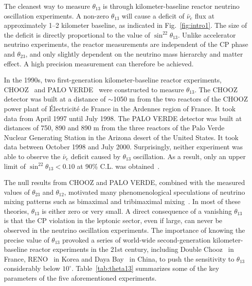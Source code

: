 \documentclass[aps,twocolumn,preprintnumbers,amsmath,superscriptaddress,amssymb,floats,nofootinbib]{revtex4-1}
\begin{document}
The cleanest way to measure $\theta_{13}$ is through kilometer-baseline reactor neutrino oscillation experiments. A non-zero $\theta_{13}$ will cause a deficit of $\bar\nu_e$ flux at approximately 1--2 kilometer baseline, as indicated in Fig.~\ref{fig:intro1}. The size of the deficit is directly proportional to the value of $\sin^22\theta_{13}$.  Unlike accelerator neutrino experiments, the reactor measurements are independent of the CP phase and $\theta_{23}$, and only slightly dependent on the neutrino mass hierarchy and matter effect. A high precision measurement can therefore be achieved.

In the 1990s, two first-generation kilometer-baseline reactor experiments, CHOOZ~\cite{Chooz} and PALO VERDE~\cite{Paloverde} were constructed to measure $\theta_{13}$. 
The CHOOZ detector was built at a distance of $\sim$1050 m from the two reactors of the CHOOZ power plant of \'{E}lectricit\'e de France in the Ardennes region of France. It took data from April 1997 until July 1998. 
The PALO VERDE detector was built at distances of 750, 890 and 890 m from the three reactors of the Palo Verde Nuclear Generating Station in the Arizona desert of the United States. It took data between October 1998 and July 2000. 
Surprisingly, neither experiment was able to observe the $\bar\nu_e$ deficit caused by $\theta_{13}$ oscillation. 
As a result, only an upper limit of $\sin^22\theta_{13} < 0.10$ at 90\% C.L. was obtained~\cite{Chooz}.

The null results from CHOOZ and PALO VERDE, combined with the measured values of $\theta_{23}$ and $\theta_{12}$, motivated many phenomenological speculations of neutrino mixing patterns such as bimaximal and tribimaximal mixing~\cite{Harrison,Altarelli}. 
In most of these theories, $\theta_{13}$ is either zero or very small. 
A direct consequence of a vanishing $\theta_{13}$ is that the CP violation in the leptonic sector, even if large, can never be observed in the neutrino oscillation experiments. 
The importance of knowing the precise value of $\theta_{13}$ provoked a series of world-wide second-generation kilometer-baseline reactor experiments in the 21st century, including Double Chooz~\cite{DChooz} in France, RENO~\cite{Reno} in Korea and Daya Bay~\cite{Dayabay} in China, to push the sensitivity to $\theta_{13}$ considerably below $10^\circ$. 
Table~\ref{tab:theta13} summarizes some of the key parameters of the five aforementioned experiments.
\end{document}
